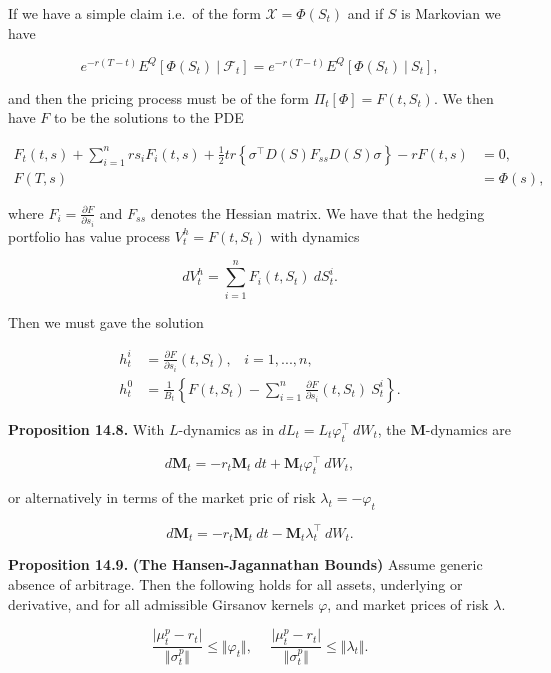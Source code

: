 \documentclass[
]{article}
\begin{document}
If we have a simple claim i.e.~of the form \(\mathcal{X}=\Phi(S_t)\) and
if \(S\) is Markovian we have

\[
e^{-r(T-t)}E^Q[\Phi(S_t)\ \vert\ \mathcal{F}_t]=e^{-r(T-t)}E^Q[\Phi(S_t)\ \vert\ S_t],
\]

and then the pricing process must be of the form
\(\Pi_t[\Phi]=F(t,S_t)\). We then have \(F\) to be the solutions to the
PDE

\begin{align*}
F_t(t,s)+\sum_{i=1}^nrs_iF_i(t,s)+\frac{1}{2}tr\left\{\sigma^\top D(S)F_{ss}D(S)\sigma\right\}-rF(t,s)&=0,\\
F(T,s)&=\Phi(s),
\end{align*}

where \(F_i=\frac{\partial F}{\partial s_i}\) and \(F_{ss}\) denotes the
Hessian matrix. We have that the hedging portfolio has value process
\(V_t^h=F(t,S_t)\) with dynamics

\[
dV_t^h=\sum_{i=1}^n F_i(t,S_t)\ dS_t^i.
\]

Then we must gave the solution

\begin{align*}
h_t^i&=\frac{\partial F}{\partial s_i}(t,S_t),\hspace{10pt}i=1,...,n,\\
h_t^0&=\frac{1}{B_t}\left\{F(t,S_t)-\sum_{i=1}^n \frac{\partial F}{\partial s_i}(t,S_t)\ S_t^i\right\}.
\end{align*}

\textbf{Proposition 14.8.} With \(L\)-dynamics as in
\(dL_t=L_t\varphi^\top_t\ dW_t\), the \(\mathbf{M}\)-dynamics are

\[
d\mathbf{M}_t=-r_t\mathbf{M}_t\ dt+\mathbf{M}_t\varphi_t^\top\ dW_t,
\]

or alternatively in terms of the market pric of risk
\(\lambda_t=-\varphi_t\)

\[
d\mathbf{M}_t=-r_t\mathbf{M}_t\ dt-\mathbf{M}_t\lambda_t^\top\ dW_t.
\]

\textbf{Proposition 14.9.} \textbf{(The Hansen-Jagannathan Bounds)}
Assume generic absence of arbitrage. Then the following holds for all
assets, underlying or derivative, and for all admissible Girsanov
kernels \(\varphi\), and market prices of risk \(\lambda\).

\[
\frac{\vert \mu_t^p - r_t\vert}{\Vert \sigma_t ^p\Vert}\le \Vert \varphi_t\Vert,\hspace{15pt} \frac{\vert \mu_t^p - r_t\vert}{\Vert \sigma_t ^p\Vert}\le \Vert \lambda_t\Vert.
\]
\end{document}

